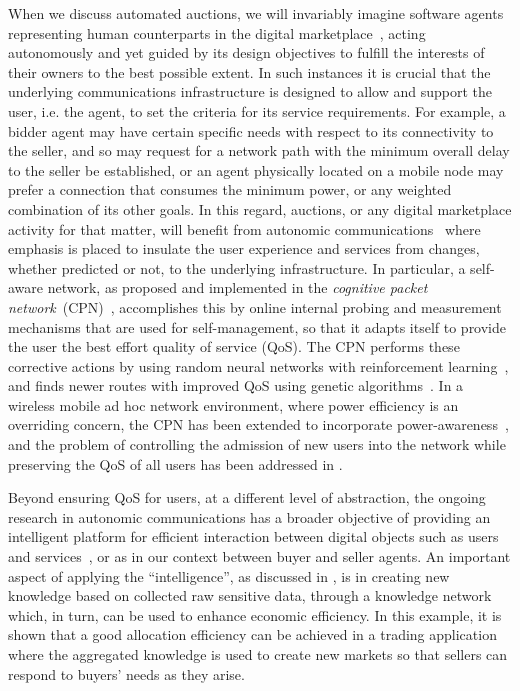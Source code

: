 \documentclass{comjnl}
\begin{document}
When we discuss automated auctions, we will invariably imagine
software agents representing human counterparts in the digital
marketplace~\cite{maes99}, acting autonomously and yet guided by
its design objectives to fulfill the interests of their owners to
the best possible extent. In such instances it is crucial that the
underlying communications infrastructure is designed to allow and
support the user, i.e. the agent, to set the criteria for its
service requirements. For example, a bidder agent may have certain
specific needs with respect to its connectivity to the seller, and
so may request for a network path with the minimum overall delay
to the seller be established, or an agent physically located on a
mobile node may prefer a connection that consumes the minimum
power, or any weighted combination of its other goals. In this
regard, auctions, or any digital marketplace activity for that
matter, will benefit from autonomic
communications~\cite{Dobson_etal_06} where emphasis is placed to
insulate the user experience and services from changes, whether
predicted or not, to the underlying infrastructure. In particular,
a self-aware network, as proposed and implemented in the
\emph{cognitive packet network}~(CPN)~\cite{Gelenbe_etal_Nagoya,
Gelenbe_Gellman_Su_ISCC03, Gelenbe-Gellman-Lent-Liu04},
accomplishes this by online internal probing and measurement
mechanisms that are used for self-management, so that it adapts
itself to provide the user the best effort quality of service
(QoS). The CPN performs these corrective actions by using random
neural networks with reinforcement
learning~\cite{Gelenbe_01_CompNetw_CPN, Gelenbe_Mascots02,
Gelenbe_Lent_Nunez_04}, and finds newer routes with improved QoS
using genetic algorithms~\cite{Gelenbe_Liu06_workshop,
Gelenbe_Liu06_GeneticAlgorithmsRouteDiscovery}. In a wireless
mobile ad hoc network environment, where power efficiency is an
overriding concern, the CPN has been extended to incorporate
power-awareness~\cite{Gelenbe-Lent_2004}, and the problem of
controlling the admission of new users into the network while
preserving the QoS of all users has been addressed in
\cite{gelenbe_sakellari_08}.

Beyond ensuring QoS for users, at a different level of
abstraction, the ongoing research in autonomic communications has
a broader objective of providing an intelligent platform for
efficient interaction between digital objects such as users and
services~\cite{Gelenbe05_UsersServicesIntNetworks}, or as in our
context between buyer and seller agents. An important aspect of
applying the ``intelligence'', as discussed in
\cite{ferdinando_etal08}, is in creating new knowledge based on
collected raw sensitive data, through a knowledge network which,
in turn, can be used to enhance economic efficiency. In this
example, it is shown that a good allocation efficiency can be
achieved in a trading application where the aggregated knowledge
is used to create new markets so that sellers can respond to
buyers' needs as they arise.
\end{document}
